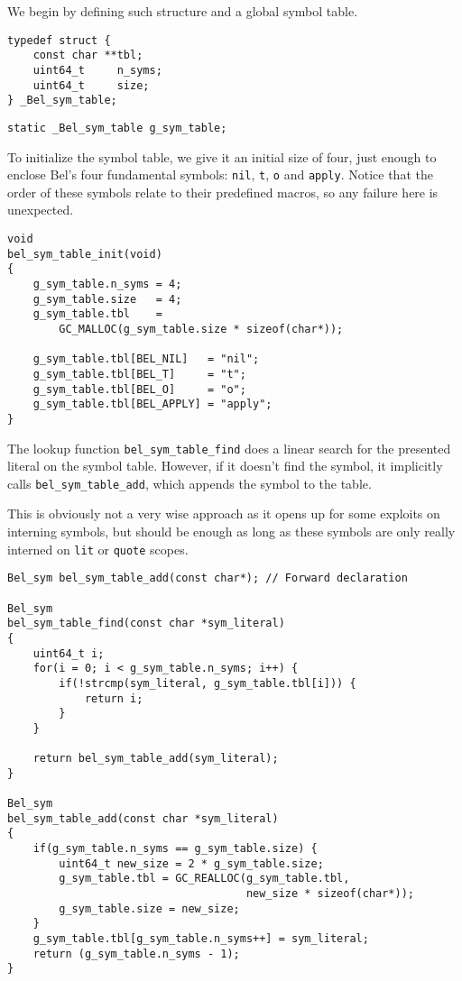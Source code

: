 \documentclass[openright,a4paper,twoside,12pt]{memoir}
\begin{document}
We begin by defining such structure and a global symbol table.

\begin{verbatim}
typedef struct {
    const char **tbl;
    uint64_t     n_syms;
    uint64_t     size;
} _Bel_sym_table;
\end{verbatim}

\begin{verbatim}
static _Bel_sym_table g_sym_table;
\end{verbatim}

To initialize the symbol table, we give it an initial size of four,
just enough to enclose Bel's four fundamental symbols: \texttt{nil}, \texttt{t}, \texttt{o} and
\texttt{apply}. Notice that the order of these symbols relate to their
predefined macros, so any failure here is unexpected.

\begin{verbatim}
void
bel_sym_table_init(void)
{
    g_sym_table.n_syms = 4;
    g_sym_table.size   = 4;
    g_sym_table.tbl    =
        GC_MALLOC(g_sym_table.size * sizeof(char*));

    g_sym_table.tbl[BEL_NIL]   = "nil";
    g_sym_table.tbl[BEL_T]     = "t";
    g_sym_table.tbl[BEL_O]     = "o";
    g_sym_table.tbl[BEL_APPLY] = "apply";
}
\end{verbatim}

The lookup function \texttt{bel\_sym\_table\_find} does a linear search for the
presented literal on the symbol table. However, if it doesn't find the
symbol, it implicitly calls \texttt{bel\_sym\_table\_add}, which appends the
symbol to the table.

This is obviously not a very wise approach as it opens up for some
exploits on interning symbols, but should be enough as long as these
symbols are only really interned on \texttt{lit} or \texttt{quote} scopes.

\begin{verbatim}
Bel_sym bel_sym_table_add(const char*); // Forward declaration

Bel_sym
bel_sym_table_find(const char *sym_literal)
{
    uint64_t i;
    for(i = 0; i < g_sym_table.n_syms; i++) {
        if(!strcmp(sym_literal, g_sym_table.tbl[i])) {
            return i;
        }
    }

    return bel_sym_table_add(sym_literal);
}

Bel_sym
bel_sym_table_add(const char *sym_literal)
{
    if(g_sym_table.n_syms == g_sym_table.size) {
        uint64_t new_size = 2 * g_sym_table.size;
        g_sym_table.tbl = GC_REALLOC(g_sym_table.tbl,
                                     new_size * sizeof(char*));
        g_sym_table.size = new_size;
    }
    g_sym_table.tbl[g_sym_table.n_syms++] = sym_literal;
    return (g_sym_table.n_syms - 1);
}
\end{verbatim}
\end{document}
